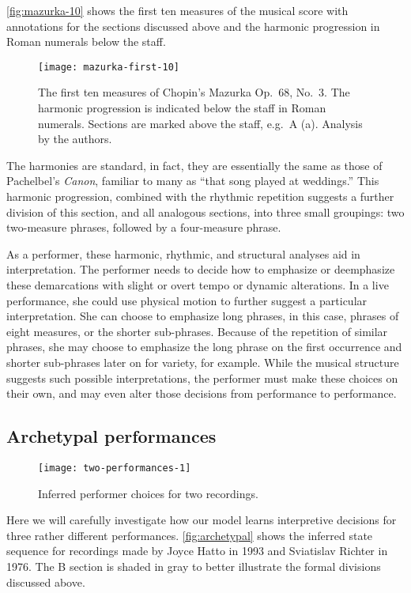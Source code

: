 \documentclass[12pt]{article}
\begin{document}
\autoref{fig:mazurka-10} shows the first ten measures of the musical
score with annotations for the sections discussed above and the
harmonic progression in Roman numerals below the staff. 
\begin{figure}[t]
  \centering
  \texttt{[image: mazurka-first-10]}
  \caption{The first ten measures of Chopin's Mazurka Op.\ 68, No.\
    3. The harmonic progression is indicated below the staff in Roman
    numerals. Sections are marked above the staff, e.g.\ A (a). Analysis by the authors.}
  \label{fig:mazurka-10}
\end{figure}
The harmonies are standard, in fact, they are essentially the same as
those of Pachelbel's {\em Canon}, familiar to many as ``that song
played at weddings.'' This harmonic progression, combined with the
rhythmic repetition suggests a further division of this section, and
all analogous sections, into three small groupings: two two-measure
phrases, followed by a four-measure phrase.

As a performer, these harmonic, rhythmic, and structural analyses aid
in interpretation. The performer needs to decide how to emphasize or
deemphasize these demarcations with slight or overt tempo or dynamic
alterations. In a live performance, she could use physical motion to
further suggest a particular interpretation. She can choose to
emphasize long phrases, in this 
case, phrases of eight measures, or the shorter sub-phrases. Because
of the repetition of similar phrases, she may choose to emphasize the
long phrase on the first occurrence and shorter sub-phrases later on
for variety, for example. While the musical structure suggests such
possible interpretations, the performer must make these choices on
their own, and may even alter those decisions from performance to
performance.



\subsection{Archetypal performances}
\label{sec:arch-perf}


\begin{figure}[t]
  \centering
  \texttt{[image: two-performances-1]}
  \caption{Inferred performer choices for two recordings. }
  \label{fig:archetypal}
\end{figure}
Here we will carefully investigate how our model learns interpretive
decisions for three rather different performances. \autoref{fig:archetypal} shows the inferred state sequence for
recordings made by Joyce Hatto in 1993 and Sviatislav Richter in
1976. The B section is
shaded in gray to better illustrate the formal divisions discussed above.
\end{document}
